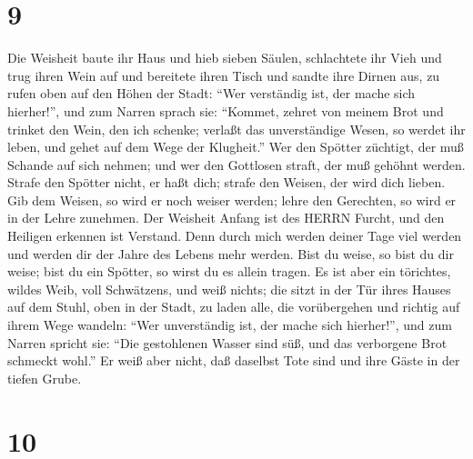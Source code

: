 \hypertarget{section-8}{%
\section{9}\label{section-8}}

 Die Weisheit baute ihr Haus und hieb sieben Säulen,
 schlachtete ihr Vieh und trug ihren Wein auf und bereitete
ihren Tisch  und sandte ihre Dirnen aus, zu rufen oben auf
den Höhen der Stadt:  ``Wer verständig ist, der mache sich
hierher!'', und zum Narren sprach sie:  ``Kommet, zehret von
meinem Brot und trinket den Wein, den ich schenke;  verlaßt
das unverständige Wesen, so werdet ihr leben, und gehet auf dem Wege der
Klugheit.''  Wer den Spötter züchtigt, der muß Schande auf
sich nehmen; und wer den Gottlosen straft, der muß gehöhnt werden.
 Strafe den Spötter nicht, er haßt dich; strafe den Weisen,
der wird dich lieben.  Gib dem Weisen, so wird er noch
weiser werden; lehre den Gerechten, so wird er in der Lehre zunehmen.
 Der Weisheit Anfang ist des HERRN Furcht, und den Heiligen
erkennen ist Verstand.  Denn durch mich werden deiner Tage
viel werden und werden dir der Jahre des Lebens mehr werden.
 Bist du weise, so bist du dir weise; bist du ein Spötter,
so wirst du es allein tragen.  Es ist aber ein törichtes,
wildes Weib, voll Schwätzens, und weiß nichts;  die sitzt
in der Tür ihres Hauses auf dem Stuhl, oben in der Stadt, 
zu laden alle, die vorübergehen und richtig auf ihrem Wege wandeln:
 ``Wer unverständig ist, der mache sich hierher!'', und zum
Narren spricht sie:  ``Die gestohlenen Wasser sind süß, und
das verborgene Brot schmeckt wohl.''  Er weiß aber nicht,
daß daselbst Tote sind und ihre Gäste in der tiefen Grube.

\hypertarget{section-9}{%
\section{10}\label{section-9}}

